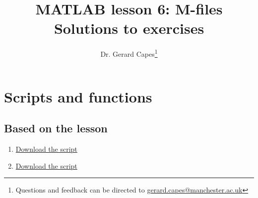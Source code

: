 \documentclass{article}
\title{MATLAB lesson 6: M-files\\Solutions to exercises}
\date{}
\author{Dr. Gerard Capes\thanks{Questions and feedback can be directed to \href{mailto:gerard.capes@manchester.ac.uk?subject=Feedback on MATLAB lesson 6 (m-files) solutions sheet}{gerard.capes@manchester.ac.uk}}}
\begin{document}
	\maketitle
	
	\section{Scripts and functions}
	\subsection*{Based on the lesson}
		\begin{enumerate}
			\item \href{https://github.com/UoMResearchIT/MATLAB-online-exercises/raw/master/lesson6_mfiles/q1.m}{Download the script}
			
			\item \href{https://github.com/UoMResearchIT/MATLAB-online-exercises/raw/master/lesson6_mfiles/q2.m}{Download the script}

		\end{enumerate}
\end{document}
